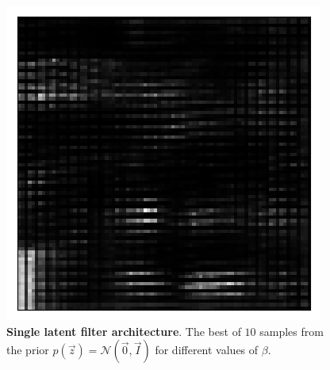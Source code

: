 \begin{figure}[h!]
\begin{multicols}{3}
    \caption{$\beta=4$}
    \includegraphics[scale=0.4]{figures/results/latent_image/beta_16_prior_sample_1.png}
    \caption{$\beta=16$}
\end{multicols}
\caption{\textbf{Single latent filter architecture}. The best of $10$ samples from the prior $p(\vec{z}) = \mathcal{N}(\vec{0}, \vec{I})$ for different values of $\beta$.}
\label{fig:latent_image_originals_prior_samples}
\end{figure}


